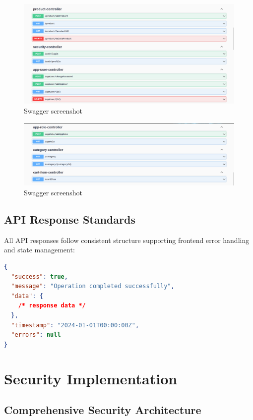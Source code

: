 \documentclass[12pt,a4paper]{article}
\begin{document}
\begin{figure}[H]
    \centering
    \includegraphics[width=1.0\textwidth]{../image-1.png}
    \caption{Swagger screenshot}

\end{figure}

\begin{figure}[H]
    \centering
    \includegraphics[width=1.0\textwidth]{../image-2.png}
    \caption{Swagger screenshot}
\end{figure}

\subsection{API Response Standards}

All API responses follow consistent structure supporting frontend error handling and state management:

\begin{lstlisting}[language=json,caption=Standard API Response Format]
{
  "success": true,
  "message": "Operation completed successfully",
  "data": {
    /* response data */
  },
  "timestamp": "2024-01-01T00:00:00Z",
  "errors": null
}
\end{lstlisting}

\section{Security Implementation}

\subsection{Comprehensive Security Architecture}
\end{document}
